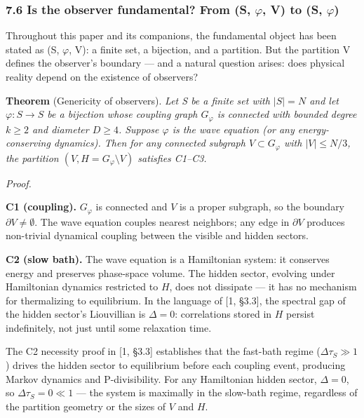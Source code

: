 \documentclass[
  11pt,
]{article}
\begin{document}
\hypertarget{is-the-observer-fundamental-from-s-ux3c6-v-to-s-ux3c6}{%
\subsubsection{7.6 Is the observer fundamental? From (S, \ensuremath{\varphi}, V) to (S,
\ensuremath{\varphi})}\label{is-the-observer-fundamental-from-s-ux3c6-v-to-s-ux3c6}}

Throughout this paper and its companions, the fundamental object has
been stated as (S, \ensuremath{\varphi}, V): a finite set, a bijection, and a partition.
But the partition V defines the observer's boundary --- and a natural
question arises: does physical reality depend on the existence of
observers?

\textbf{Theorem} (Genericity of observers). \emph{Let S be a finite set
with \(|S| = N\) and let \(\varphi: S \to S\) be a bijection whose
coupling graph \(G_\varphi\) is connected with bounded degree
\(k \geq 2\) and diameter \(D \geq 4\). Suppose \(\varphi\) is the wave
equation (or any energy-conserving dynamics). Then for any connected
subgraph \(V \subset G_\varphi\) with \(|V| \leq N/3\), the partition
\((V, H = G_\varphi \setminus V)\) satisfies C1--C3.}

\emph{Proof.}

\textbf{C1 (coupling).} \(G_\varphi\) is connected and \(V\) is a proper
subgraph, so the boundary \(\partial V \neq \emptyset\). The wave
equation couples nearest neighbors; any edge in \(\partial V\) produces
non-trivial dynamical coupling between the visible and hidden sectors.

\textbf{C2 (slow bath).} The wave equation is a Hamiltonian system: it
conserves energy and preserves phase-space volume. The hidden sector,
evolving under Hamiltonian dynamics restricted to \(H\), does not
dissipate --- it has no mechanism for thermalizing to equilibrium. In
the language of {[}1, §3.3{]}, the spectral gap of the hidden sector's
Liouvillian is \(\Delta = 0\): correlations stored in \(H\) persist
indefinitely, not just until some relaxation time.

The C2 necessity proof in {[}1, §3.3{]} establishes that the fast-bath
regime (\(\Delta \tau_S \gg 1\)) drives the hidden sector to equilibrium
before each coupling event, producing Markov dynamics and
P-divisibility. For any Hamiltonian hidden sector, \(\Delta = 0\), so
\(\Delta \tau_S = 0 \ll 1\) --- the system is maximally in the slow-bath
regime, regardless of the partition geometry or the sizes of \(V\) and
\(H\).
\end{document}
